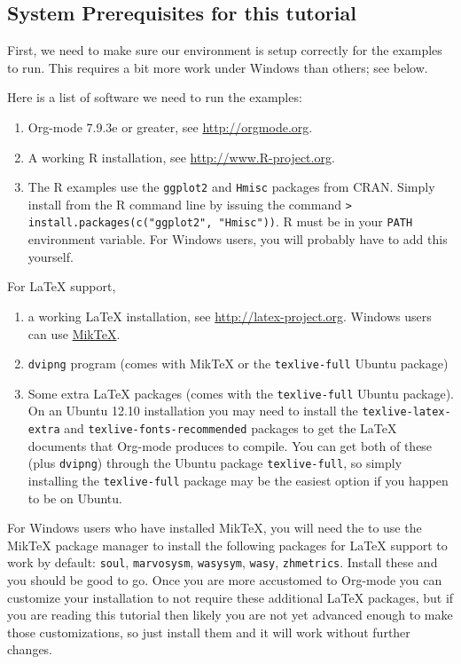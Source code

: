 \documentclass[11pt]{article}
\begin{document}
\subsection*{System Prerequisites for this tutorial}
\label{sec-1-1}

First, we need to make sure our environment is setup correctly for the
examples to run.  This requires a bit more work under Windows than
others; see below.

Here is a list of software we need to run the examples:
\begin{enumerate}
\item Org-mode 7.9.3e or greater, see \url{http://orgmode.org}.
\item A working R installation, see \url{http://www.R-project.org}.
\item The R examples use the \texttt{ggplot2} and \texttt{Hmisc} packages from
CRAN. Simply install from the R command line by issuing the
command \texttt{> install.packages(c("ggplot2", "Hmisc"))}. R must be in
your \texttt{PATH} environment variable.  For Windows users, you will
probably have to add this yourself.
\end{enumerate}

For \LaTeX{} support, 
\begin{enumerate}
\item a working \LaTeX{} installation, see \url{http://latex-project.org}. Windows
users can use \href{http://miktex.org/}{MikTeX}.
\item \texttt{dvipng} program (comes with MikTeX or the \texttt{texlive-full} Ubuntu
package)
\item Some extra \LaTeX{} packages (comes with the \texttt{texlive-full} Ubuntu
package). On an Ubuntu 12.10 installation you may need to install
the \texttt{texlive-latex-extra} and \texttt{texlive-fonts-recommended} packages
to get the \LaTeX{} documents that Org-mode produces to compile. You
can get both of these (plus \texttt{dvipng}) through the Ubuntu package
\texttt{texlive-full}, so simply installing the \texttt{texlive-full} package may
be the easiest option if you happen to be on Ubuntu.
\end{enumerate}

For Windows users who have installed MikTeX, you will need the to use
the MikTeX package manager to install the following packages for \LaTeX{}
support to work by default: \texttt{soul}, \texttt{marvosysm}, \texttt{wasysym}, \texttt{wasy},
\texttt{zhmetrics}. Install these and you should be good to go. Once you are
more accustomed to Org-mode you can customize your installation to not
require these additional \LaTeX{} packages, but if you are reading this
tutorial then likely you are not yet advanced enough to make those
customizations, so just install them and it will work without further
changes.
\end{document}
